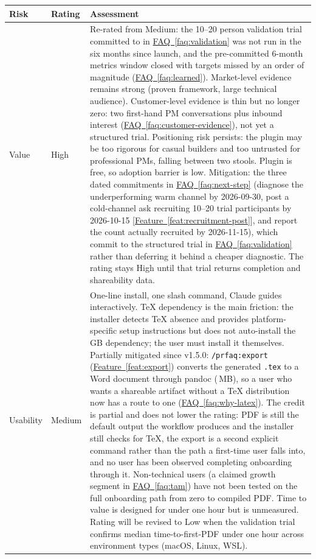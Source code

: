 \documentclass[11pt,letterpaper]{article}
\newcommand{\faqref}[1]{\hyperref[#1]{FAQ~\ref*{#1}}}
\newcommand{\featureref}[1]{\hyperref[#1]{Feature~\ref*{#1}}}
\begin{document}
\renewcommand{\arraystretch}{1.6}
\begin{tabularx}{\textwidth}{@{} l l X @{}}
\toprule
\textbf{\color{SectionBlue}Risk} & \textbf{\color{SectionBlue}Rating} & \textbf{\color{SectionBlue}Assessment} \\
\midrule
Value      & \textcolor{RiskRed}{High} & Re-rated from Medium: the 10--20 person validation trial committed to in \faqref{faq:validation} was not run in the six months since launch, and the pre-committed 6-month metrics window closed with targets missed by an order of magnitude (\faqref{faq:learned}). Market-level evidence remains strong (proven framework, large technical audience). Customer-level evidence is thin but no longer zero: two first-hand PM conversations plus inbound interest (\faqref{faq:customer-evidence}), not yet a structured trial. Positioning risk persists: the plugin may be too rigorous for casual builders and too untrusted for professional PMs, falling between two stools. Plugin is free, so adoption barrier is low. Mitigation: the three dated commitments in \faqref{faq:next-step} (diagnose the underperforming warm channel by 2026-09-30, post a cold-channel ask recruiting 10--20 trial participants by 2026-10-15 [\featureref{feat:recruitment-post}], and report the count actually recruited by 2026-11-15), which commit to the structured trial in \faqref{faq:validation} rather than deferring it behind a cheaper diagnostic. The rating stays High until that trial returns completion and shareability data. \\
Usability  & \textcolor{RiskAmber}{Medium} & One-line install, one slash command, Claude guides interactively. TeX dependency is the main friction: the installer detects TeX absence and provides platform-specific setup instructions but does not auto-install the \texttildelow4\,GB dependency; the user must install it themselves. Partially mitigated since v1.5.0: \texttt{/prfaq:export} (\featureref{feat:export}) converts the generated \texttt{.tex} to a Word document through pandoc (\texttildelow50\,MB), so a user who wants a shareable artifact without a TeX distribution now has a route to one (\faqref{faq:why-latex}). The credit is partial and does not lower the rating: PDF is still the default output the workflow produces and the installer still checks for TeX, the export is a second explicit command rather than the path a first-time user falls into, and no user has been observed completing onboarding through it. Non-technical users (a claimed growth segment in \faqref{faq:tam}) have not been tested on the full onboarding path from zero to compiled PDF. Time to value is designed for under one hour but is unmeasured. Rating will be revised to Low when the validation trial confirms median time-to-first-PDF under one hour across environment types (macOS, Linux, WSL). \\

\end{tabularx}
\end{document}
